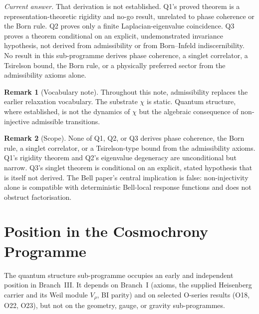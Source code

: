 \documentclass[11pt,a4paper]{article}
\theoremstyle{definition}
\newtheorem{remark}{Remark}
\newcommand{\Vr}{V_\rho}
\begin{document}
    \medskip
    \noindent\textit{Current answer.}
    That derivation is not established. Q1's proved theorem is a representation-theoretic
    rigidity and no-go result, unrelated to phase coherence or the Born rule. Q2 proves only a
    finite Laplacian-eigenvalue coincidence. Q3 proves a theorem conditional on an explicit,
    undemonstrated invariance hypothesis, not derived from admissibility or from Born--Infeld
    indiscernibility. No result in this sub-programme derives phase coherence, a singlet
    correlator, a Tsirelson bound, the Born rule, or a physically preferred sector from the
    admissibility axioms alone.

    \begin{remark}[Vocabulary note]
      Throughout this note, admissibility replaces the earlier relaxation vocabulary. The
      substrate $\chi$ is static. Quantum structure, where established, is not the dynamics of
      $\chi$ but the algebraic consequence of non-injective admissible transitions.
    \end{remark}

    \begin{remark}[Scope]
      None of Q1, Q2, or Q3 derives phase coherence, the Born rule, a singlet correlator, or a
      Tsirelson-type bound from the admissibility axioms. Q1's rigidity theorem and Q2's
      eigenvalue degeneracy are unconditional but narrow. Q3's singlet theorem is conditional on
      an explicit, stated hypothesis that is itself not derived. The Bell paper's central
      implication is false: non-injectivity alone is compatible with deterministic Bell-local
      response functions and does not obstruct factorisation.
    \end{remark}

  \section{Position in the Cosmochrony Programme}
    \label{sec:position}

    The quantum structure sub-programme occupies an early and independent position in Branch~III.
    It depends on Branch~I (axioms, the supplied Heisenberg carrier and its Weil module $\Vr$, BI parity) and on
    selected O-series results (O18, O22, O23), but not on the geometry, gauge, or gravity sub-programmes.
\end{document}
